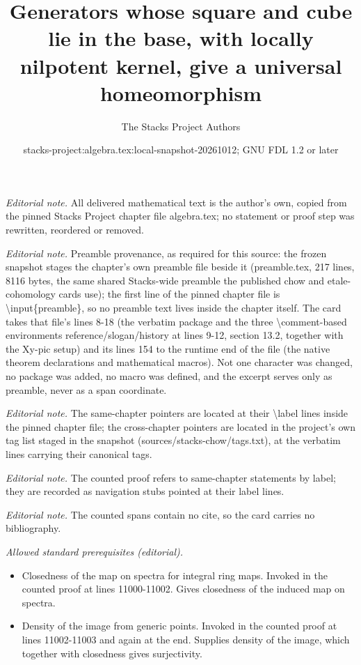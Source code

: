\documentclass[10pt,a4paper]{amsart}
\title{Generators whose square and cube lie in the base, with locally nilpotent kernel, give a universal homeomorphism}
\author{The Stacks Project Authors}
\date{stacks-project:algebra.tex:local-snapshot-20261012; GNU FDL 1.2 or later}
\theoremstyle{plain}
\theoremstyle{definition}
\theoremstyle{remark}
\numberwithin{equation}{subsection}
\begin{document}
\maketitle
\noindent\textit{Editorial note.} All delivered mathematical text is the author's own, copied from the pinned Stacks Project chapter file algebra.tex; no statement or proof step was rewritten, reordered or removed.\par\medskip
\noindent\textit{Editorial note.} Preamble provenance, as required for this source: the frozen snapshot stages the chapter's own preamble file beside it (preamble.tex, 217 lines, 8116 bytes, the same shared Stacks-wide preamble the published chow and etale-cohomology cards use); the first line of the pinned chapter file is \textbackslash{}input\{preamble\}, so no preamble text lives inside the chapter itself. The card takes that file's lines 8-18 (the verbatim package and the three \textbackslash{}comment-based environments reference/slogan/history at lines 9-12, section 13.2, together with the Xy-pic setup) and its lines 154 to the runtime end of the file (the native theorem declarations and mathematical macros). Not one character was changed, no package was added, no macro was defined, and the excerpt serves only as preamble, never as a span coordinate.\par\medskip
\noindent\textit{Editorial note.} The same-chapter pointers are located at their \textbackslash{}label lines inside the pinned chapter file; the cross-chapter pointers are located in the project's own tag list staged in the snapshot (sources/stacks-chow/tags.txt), at the verbatim lines carrying their canonical tags.\par\medskip
\noindent\textit{Editorial note.} The counted proof refers to same-chapter statements by label; they are recorded as navigation stubs pointed at their label lines.\par\medskip
\noindent\textit{Editorial note.} The counted spans contain no cite, so the card carries no bibliography.\par\medskip
\noindent\textit{Allowed standard prerequisites (editorial).}\begin{itemize}
\item Closedness of the map on spectra for integral ring maps. Invoked in the counted proof at lines 11000-11002. Gives closedness of the induced map on spectra.
\item Density of the image from generic points. Invoked in the counted proof at lines 11002-11003 and again at the end. Supplies density of the image, which together with closedness gives surjectivity.
\end{itemize}\medskip
\end{document}
